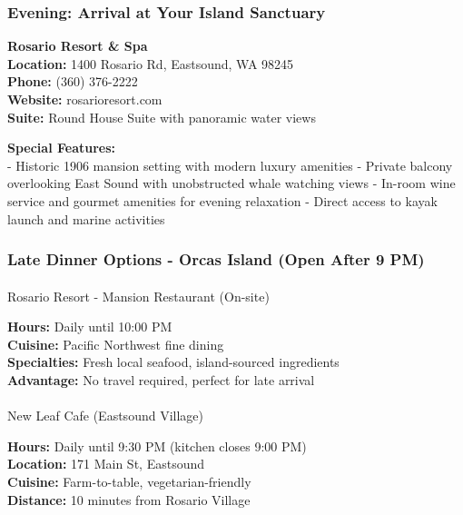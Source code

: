 \documentclass[
  11pt,
  letterpaper,
  DIV=10,
  numbers=noendperiod]{scrartcl}
\makeatletter
\let\oldparagraph\paragraph
\renewcommand{\paragraph}{
    \@ifstar
      \xxxParagraphStar
      \xxxParagraphNoStar
  }
\newcommand{\xxxParagraphStar}[1]{\oldparagraph*{#1}\mbox{}}
\newcommand{\xxxParagraphNoStar}[1]{\oldparagraph{#1}\mbox{}}
\makeatother
\begin{document}
\subsubsection{Evening: Arrival at Your Island
Sanctuary}\label{evening-arrival-at-your-island-sanctuary}

\textbf{Rosario Resort \& Spa}\\
\textbf{Location:} 1400 Rosario Rd, Eastsound, WA 98245\\
\textbf{Phone:} (360) 376-2222\\
\textbf{Website:} rosarioresort.com\\
\textbf{Suite:} Round House Suite with panoramic water views

\textbf{Special Features:}\\
- Historic 1906 mansion setting with modern luxury amenities - Private
balcony overlooking East Sound with unobstructed whale watching views -
In-room wine service and gourmet amenities for evening relaxation -
Direct access to kayak launch and marine activities

\subsubsection{Late Dinner Options - Orcas Island (Open After 9
PM)}\label{late-dinner-options---orcas-island-open-after-9-pm}

\paragraph{Rosario Resort - Mansion Restaurant
(On-site)}\label{rosario-resort---mansion-restaurant-on-site}

\textbf{Hours:} Daily until 10:00 PM\\
\textbf{Cuisine:} Pacific Northwest fine dining\\
\textbf{Specialties:} Fresh local seafood, island-sourced ingredients\\
\textbf{Advantage:} No travel required, perfect for late arrival

\paragraph{New Leaf Cafe (Eastsound
Village)}\label{new-leaf-cafe-eastsound-village}

\textbf{Hours:} Daily until 9:30 PM (kitchen closes 9:00 PM)\\
\textbf{Location:} 171 Main St, Eastsound\\
\textbf{Cuisine:} Farm-to-table, vegetarian-friendly\\
\textbf{Distance:} 10 minutes from Rosario Village
\end{document}
